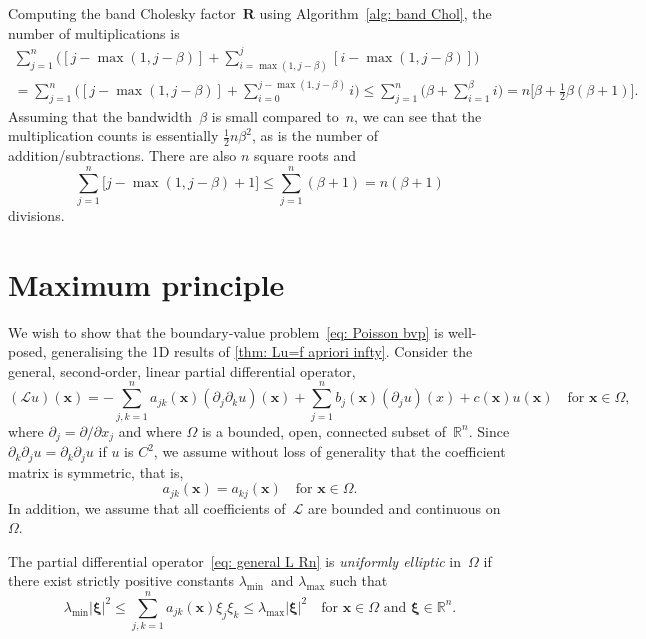 Computing the band Cholesky factor~$\boldsymbol{R}$ using 
Algorithm~\ref{alg: band Chol}, the number of multiplications is
\begin{multline*}
\sum_{j=1}^n\biggl([j-\max(1,j-\beta)]
+\sum_{i=\max(1,j-\beta)}^j[i-\max(1,j-\beta)]\biggr)\\
	=\sum_{j=1}^n\biggl([j-\max(1,j-\beta)]
	+\sum_{i=0}^{j-\max(1,j-\beta)}i\biggr)
	\le\sum_{j=1}^n\biggl(\beta+\sum_{i=1}^\beta i\biggr)
	=n\bigl[\beta+\tfrac12\beta(\beta+1)\bigr].
\end{multline*}
Assuming that the bandwidth~$\beta$ is small compared to~$n$, we can see that 
the multiplication counts is essentially $\tfrac12n\beta^2$, as is the number 
of addition/subtractions.  There are also $n$ square roots and
\[
\sum_{j=1}^n\bigl[j-\max(1,j-\beta)+1]\le\sum_{j=1}^n(\beta+1)=n(\beta+1)
\]
divisions.


\section{Maximum principle}
\newcommand{\bx}{\boldsymbol{x}}
\newcommand{\by}{\boldsymbol{y}}
We wish to show that the boundary-value problem~\eqref{eq: Poisson bvp} is
well-posed, generalising the 1D results of \cref{thm: Lu=f apriori infty}.
Consider the general, second-order, linear partial differential operator,
\begin{equation}\label{eq: general L Rn}
(\mathcal{L}u)(\bx)
	=-\sum_{j,k=1}^na_{jk}(\bx)(\partial_j\partial_ku)(\bx)
	+\sum_{j=1}^nb_j(\bx)(\partial_ju)(x)+c(\bx)u(\bx)
\quad\text{for $\bx\in\Omega$,}
\end{equation}
where $\partial_j=\partial/\partial x_j$ and where $\Omega$ is a bounded,
open, connected subset of~$\mathbb{R}^n$.  Since 
$\partial_k\partial_ju=\partial_k\partial_ju$ if $u$ is $C^2$, we assume
without loss of generality that the coefficient matrix is symmetric, that is,
\[
a_{jk}(\bx)=a_{kj}(\bx)\quad\text{for $\bx\in\Omega$.}
\]
In addition, we assume that all coefficients of~$\mathcal{L}$ are bounded
and continuous on~$\Omega$.  

\begin{definition}
The partial differential operator~\eqref{eq: general L Rn} is
\emph{uniformly elliptic} in~$\Omega$ if there exist strictly positive 
constants $\lambda_{\min}$~and $\lambda_{\max}$ such that
\[
\lambda_{\min}|\boldsymbol{\xi}|^2\le\sum_{j,k=1}^na_{jk}(\bx)\xi_j\xi_k
	\le\lambda_{\max}|\boldsymbol{\xi}|^2
\quad\text{for $\bx\in\Omega$ and $\boldsymbol{\xi}\in\mathbb{R}^n$.}
\]
\end{definition}

